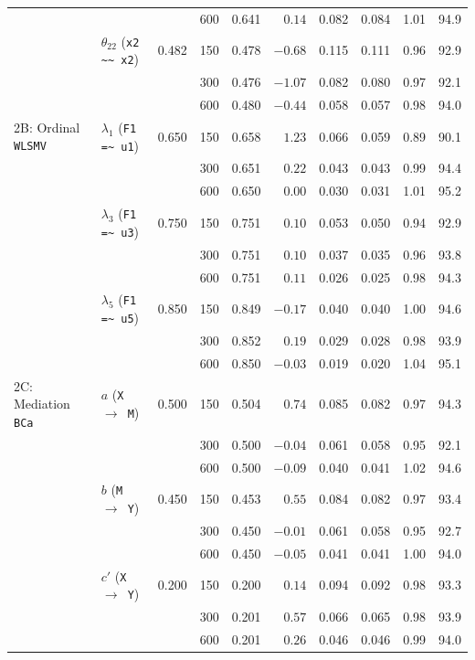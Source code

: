 ﻿\documentclass[12pt,letterpaper]{article}
\begin{document}
\begin{table}[htbp]
\begin{tabular}{llrrrrrrrr}
 & & & 600 & 0.641 & $0.14$ & 0.082 & 0.084 & 1.01 & 94.9 \\
 & $\theta_{22}$ (\texttt{x2 \textasciitilde\textasciitilde{} x2}) & 0.482 & 150 & 0.478 & $-0.68$ & 0.115 & 0.111 & 0.96 & 92.9 \\
 & & & 300 & 0.476 & $-1.07$ & 0.082 & 0.080 & 0.97 & 92.1 \\
 & & & 600 & 0.480 & $-0.44$ & 0.058 & 0.057 & 0.98 & 94.0 \\
\addlinespace
2B: Ordinal \texttt{WLSMV} & $\lambda_1$ (\texttt{F1 =\textasciitilde{} u1}) & 0.650 & 150 & 0.658 & $1.23$ & 0.066 & 0.059 & 0.89 & 90.1 \\
 & & & 300 & 0.651 & $0.22$ & 0.043 & 0.043 & 0.99 & 94.4 \\
 & & & 600 & 0.650 & $0.00$ & 0.030 & 0.031 & 1.01 & 95.2 \\
 & $\lambda_3$ (\texttt{F1 =\textasciitilde{} u3}) & 0.750 & 150 & 0.751 & $0.10$ & 0.053 & 0.050 & 0.94 & 92.9 \\
 & & & 300 & 0.751 & $0.10$ & 0.037 & 0.035 & 0.96 & 93.8 \\
 & & & 600 & 0.751 & $0.11$ & 0.026 & 0.025 & 0.98 & 94.3 \\
 & $\lambda_5$ (\texttt{F1 =\textasciitilde{} u5}) & 0.850 & 150 & 0.849 & $-0.17$ & 0.040 & 0.040 & 1.00 & 94.6 \\
 & & & 300 & 0.852 & $0.19$ & 0.029 & 0.028 & 0.98 & 93.9 \\
 & & & 600 & 0.850 & $-0.03$ & 0.019 & 0.020 & 1.04 & 95.1 \\
\addlinespace
2C: Mediation \texttt{BCa} & $a$ (\texttt{X $\to$ M}) & 0.500 & 150 & 0.504 & $0.74$ & 0.085 & 0.082 & 0.97 & 94.3 \\
 & & & 300 & 0.500 & $-0.04$ & 0.061 & 0.058 & 0.95 & 92.1 \\
 & & & 600 & 0.500 & $-0.09$ & 0.040 & 0.041 & 1.02 & 94.6 \\
 & $b$ (\texttt{M $\to$ Y}) & 0.450 & 150 & 0.453 & $0.55$ & 0.084 & 0.082 & 0.97 & 93.4 \\
 & & & 300 & 0.450 & $-0.01$ & 0.061 & 0.058 & 0.95 & 92.7 \\
 & & & 600 & 0.450 & $-0.05$ & 0.041 & 0.041 & 1.00 & 94.0 \\
 & $c'$ (\texttt{X $\to$ Y}) & 0.200 & 150 & 0.200 & $0.14$ & 0.094 & 0.092 & 0.98 & 93.3 \\
 & & & 300 & 0.201 & $0.57$ & 0.066 & 0.065 & 0.98 & 93.9 \\
 & & & 600 & 0.201 & $0.26$ & 0.046 & 0.046 & 0.99 & 94.0 \\

\end{tabular}
\end{table}
\end{document}
